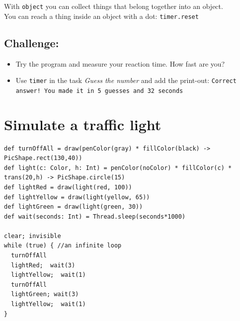 With \lstinline{object}  you can collect things that belong together into an object.\\
 You can reach a thing inside an object with a dot: \lstinline{timer.reset}
\section*{\color{BrickRed}Challenge:}


\begin{itemize}

\item {Try the program and measure your reaction time. How fast are you?}
\item {Use \lstinline{timer} in the task {\it Guess the number} and add the print-out: \lstinline{Correct answer! You made it in 5 guesses and 32 seconds}}

\end{itemize}


\chapter{Simulate a traffic light}
  

\begin{lstlisting}[basicstyle={\ttfamily\fontsize{14}{17}\selectfont},numbers=none]
def turnOffAll = draw(penColor(gray) * fillColor(black) -> PicShape.rect(130,40))
def light(c: Color, h: Int) = penColor(noColor) * fillColor(c) * trans(20,h) -> PicShape.circle(15)
def lightRed = draw(light(red, 100))
def lightYellow = draw(light(yellow, 65))
def lightGreen = draw(light(green, 30))
def wait(seconds: Int) = Thread.sleep(seconds*1000)

clear; invisible  
while (true) { //an infinite loop
  turnOffAll
  lightRed;  wait(3)
  lightYellow;  wait(1) 
  turnOffAll
  lightGreen; wait(3)
  lightYellow;  wait(1)
}
\end{lstlisting}
        
